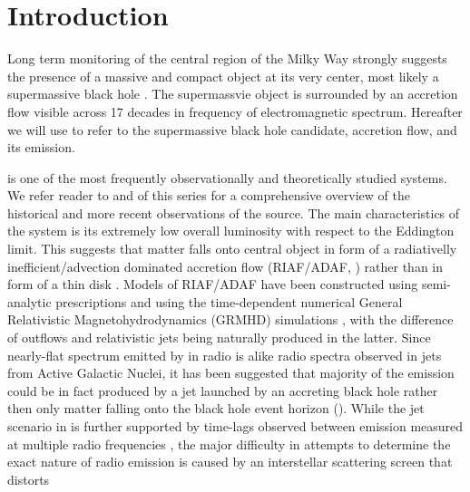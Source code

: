 \section{Introduction}\label{sec:intro}


Long term monitoring of the central region of the Milky Way strongly suggests the presence of a massive and compact object at its very center, most likely a supermassive black hole \citep{2019Sci...365..664D,2019A&A...625L..10G}. The supermassvie object is surrounded by an accretion flow visible across 17 decades in frequency of electromagnetic spectrum. Hereafter we will use \sgra to refer to the supermassive black hole candidate, accretion flow, and its emission.

\sgra is one of the most frequently observationally and theoretically studied systems.  We refer reader to  and  of this series for a comprehensive overview of the historical and more recent observations of the source. The main characteristics of the \sgra system is its extremely low overall luminosity with respect to the Eddington limit. This suggests that matter falls onto \sgra central object in form of a radiativelly inefficient/advection dominated accretion flow (RIAF/ADAF, \citealt{1977ApJ...214..840I,1994ApJ...428L..13N, 1995ApJ...444..231N,
  1995ApJ...452..710N, 1996A&AS..120C.287N, 1998ApJ...492..554N,2014ARA&A..52..529Y}) rather than in form of a thin disk \citep{1973A&A....24..337S}. Models of RIAF/ADAF have been constructed using semi-analytic prescriptions \citep[e.g.,][]{1995Natur.374..623N,2000ApJ...541..234O, 2009ApJ...697...45B,2011ApJ...735..110B} and using the time-dependent numerical General Relativistic Magnetohydrodynamics (GRMHD) simulations \citep[e.g.,][]{2000ApJ...528..462H, 2003ApJ...589..458D,
  2003ApJ...589..444G, 2007CQGra..24S.235G, 2012ApJS..201....9F,
  2014ApJ...796...22F, 2016ApJS..225...22W, 2017ApJS..231...17A,
  2018JPhCS1031a2008O, 2019A&A...629A..61O, 2019ApJS..243...26P}, with the difference of outflows and
relativistic jets being naturally produced in the latter. Since nearly-flat spectrum emitted by \sgra in radio is alike radio spectra observed in jets from Active Galactic Nuclei, it has been suggested that majority of the \sgra emission could be in fact produced by a jet launched by an accreting black hole rather then only matter falling onto the black hole event horizon
(\citealt{2000A&A...362..113F}).
While the jet scenario in \sgra is further supported by time-lags observed between emission measured at multiple radio frequencies \citep{2021arXiv210713402B}, the major difficulty in attempts to determine the exact nature of \sgra radio emission is caused by an interstellar scattering screen that distorts
